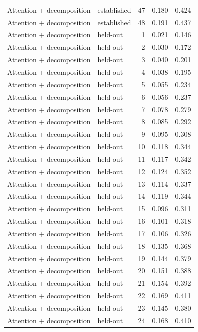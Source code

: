 \begin{tabular}{llrrr}
Attention + decomposition & established & 47 & 0.180 & 0.424 \\
Attention + decomposition & established & 48 & 0.191 & 0.437 \\
Attention + decomposition & held-out & 1 & 0.021 & 0.146 \\
Attention + decomposition & held-out & 2 & 0.030 & 0.172 \\
Attention + decomposition & held-out & 3 & 0.040 & 0.201 \\
Attention + decomposition & held-out & 4 & 0.038 & 0.195 \\
Attention + decomposition & held-out & 5 & 0.055 & 0.234 \\
Attention + decomposition & held-out & 6 & 0.056 & 0.237 \\
Attention + decomposition & held-out & 7 & 0.078 & 0.279 \\
Attention + decomposition & held-out & 8 & 0.085 & 0.292 \\
Attention + decomposition & held-out & 9 & 0.095 & 0.308 \\
Attention + decomposition & held-out & 10 & 0.118 & 0.344 \\
Attention + decomposition & held-out & 11 & 0.117 & 0.342 \\
Attention + decomposition & held-out & 12 & 0.124 & 0.352 \\
Attention + decomposition & held-out & 13 & 0.114 & 0.337 \\
Attention + decomposition & held-out & 14 & 0.119 & 0.344 \\
Attention + decomposition & held-out & 15 & 0.096 & 0.311 \\
Attention + decomposition & held-out & 16 & 0.101 & 0.318 \\
Attention + decomposition & held-out & 17 & 0.106 & 0.326 \\
Attention + decomposition & held-out & 18 & 0.135 & 0.368 \\
Attention + decomposition & held-out & 19 & 0.144 & 0.379 \\
Attention + decomposition & held-out & 20 & 0.151 & 0.388 \\
Attention + decomposition & held-out & 21 & 0.154 & 0.392 \\
Attention + decomposition & held-out & 22 & 0.169 & 0.411 \\
Attention + decomposition & held-out & 23 & 0.145 & 0.380 \\
Attention + decomposition & held-out & 24 & 0.168 & 0.410 \\

\end{tabular}
